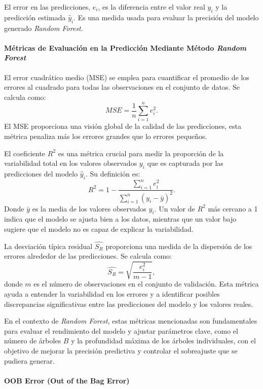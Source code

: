 El error en las predicciones, \(e_i\), es la diferencia entre el valor real \(y_i\) y la predicción estimada \(\hat{y}_i\). Es una medida usada para evaluar la precisión del modelo generado \textit{Random Forest}. 

\paragraph{Métricas de Evaluación en la Predicción Mediante Método \textit{Random Forest}}

El error cuadrático medio (MSE) se emplea para cuantificar el promedio de los errores al cuadrado para todas las observaciones en el conjunto de datos. Se calcula como:
\[ MSE = \frac{1}{n} \sum_{i=1}^{n} e_i^2.\]
El MSE proporciona una visión global de la calidad de las predicciones, esta métrica penaliza más los errores grandes que lo errores pequeños.

El coeficiente \(R^2\) es una métrica crucial para medir la proporción de la variabilidad total en los valores observados \(y_i\) que es capturada por las predicciones del modelo \(\hat{y}_i\). Su definición es:
\[ R^2 = 1 - \frac{\sum_{i=1}^{n} e_i^2}{\sum_{i=1}^{n} (y_i - \bar{y})^2}.\]
Donde \(\bar{y}\) es la media de los valores observados \(y_i\). Un valor de \(R^2\) más cercano a 1 indica que el modelo se ajusta bien a los datos, mientras que un valor bajo sugiere que el modelo no es capaz de explicar la variabilidad.

La desviación típica residual \({\hat{S_R}}\) proporciona una medida de la dispersión de los errores alrededor de las predicciones. Se calcula como:
\[ {\hat{S_R}} = \sqrt{\frac{e_i^2}{m-1}},\]
donde \(m\) es el número de observaciones en el conjunto de validación. Esta métrica ayuda a entender la variabilidad en los errores y a identificar posibles discrepancias significativas entre las predicciones del modelo y los valores reales.

En el contexto de \textit{Random Forest}, estas métricas mencionadas son fundamentales para evaluar el rendimiento del modelo y ajustar parámetros clave, como el número de árboles \(B\) y la profundidad máxima de los árboles individuales, con el objetivo de mejorar la precisión predictiva y controlar el sobreajuste que se pudiera generar.



\paragraph{OOB Error (Out of the Bag Error)}\label{sec:oob}

